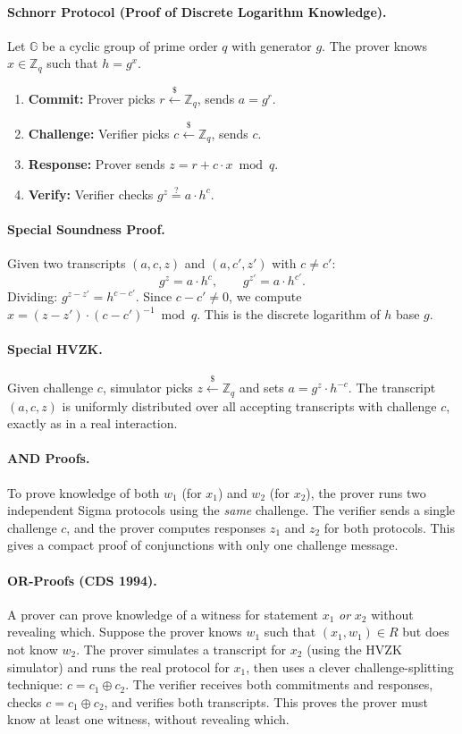 \paragraph{Schnorr Protocol (Proof of Discrete Logarithm Knowledge).}
Let $\mathbb{G}$ be a cyclic group of prime order $q$ with generator $g$. The prover knows $x \in \mathbb{Z}_q$ such that $h = g^x$.

\begin{enumerate}
\item \textbf{Commit:} Prover picks $r \xleftarrow{\$} \mathbb{Z}_q$, sends $a = g^r$.
\item \textbf{Challenge:} Verifier picks $c \xleftarrow{\$} \mathbb{Z}_q$, sends $c$.
\item \textbf{Response:} Prover sends $z = r + c \cdot x \bmod q$.
\item \textbf{Verify:} Verifier checks $g^z \stackrel{?}{=} a \cdot h^c$.
\end{enumerate}

\paragraph{Special Soundness Proof.} Given two transcripts $(a, c, z)$ and $(a, c', z')$ with $c \neq c'$:
\[
g^z = a \cdot h^c, \qquad g^{z'} = a \cdot h^{c'}.
\]
Dividing: $g^{z - z'} = h^{c - c'}$. Since $c - c' \neq 0$, we compute $x = (z - z') \cdot (c - c')^{-1} \bmod q$. This is the discrete logarithm of $h$ base $g$.

\paragraph{Special HVZK.} Given challenge $c$, simulator picks $z \xleftarrow{\$} \mathbb{Z}_q$ and sets $a = g^z \cdot h^{-c}$. The transcript $(a, c, z)$ is uniformly distributed over all accepting transcripts with challenge $c$, exactly as in a real interaction.

\paragraph{AND Proofs.} To prove knowledge of both $w_1$ (for $x_1$) and $w_2$ (for $x_2$), the prover runs two independent Sigma protocols using the \emph{same} challenge. The verifier sends a single challenge $c$, and the prover computes responses $z_1$ and $z_2$ for both protocols. This gives a compact proof of conjunctions with only one challenge message.

\paragraph{OR-Proofs (CDS 1994).} A prover can prove knowledge of a witness for statement $x_1$ \emph{or} $x_2$ without revealing which. Suppose the prover knows $w_1$ such that $(x_1, w_1) \in R$ but does not know $w_2$. The prover simulates a transcript for $x_2$ (using the HVZK simulator) and runs the real protocol for $x_1$, then uses a clever challenge-splitting technique: $c = c_1 \oplus c_2$. The verifier receives both commitments and responses, checks $c = c_1 \oplus c_2$, and verifies both transcripts. This proves the prover must know at least one witness, without revealing which.

